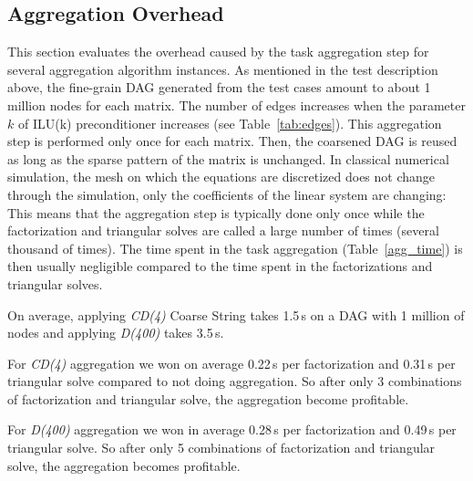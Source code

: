 \subsection{Aggregation Overhead}
This section evaluates the overhead caused by the task aggregation
step for several aggregation algorithm instances. As mentioned in
the test description above, the fine-grain DAG generated from the
test cases amount to about 1 million nodes for each matrix. The
number of edges increases when the parameter $k$ of ILU(k) preconditioner increases (see Table~\ref{tab:edges}).
This aggregation step is performed only once for each matrix. Then, the
coarsened DAG is reused as long as the sparse pattern of the matrix is unchanged.
In classical numerical simulation, the mesh on which the equations are discretized
does not change through the simulation, only the coefficients of the linear system
are changing: This means that the aggregation step is typically done only once
while the factorization and triangular solves are called a large number of times (several thousand of times).
The time spent in the task aggregation (Table~\ref{agg_time}) is then usually negligible
compared to the time spent in the factorizations and triangular solves.


On average, applying {\em CD(4)} Coarse String takes 1.5\,s on a DAG with 1 million
of nodes and applying {\em D(400)} takes 3.5\,s.

For {\em CD(4)} aggregation we won on average 0.22\,s per factorization
and 0.31\,s per triangular solve compared to not doing aggregation. So
after only 3 combinations of factorization and triangular solve, the aggregation
become profitable.

For {\em D(400)} aggregation we won in average 0.28\,s per factorization
and 0.49\,s per triangular solve. So after only 5 combinations of factorization
and triangular solve, the aggregation becomes profitable.


